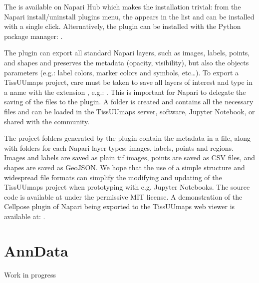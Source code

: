 \documentclass[letterpaper,10pt,english,openany,oneside]{sphinxmanual}
\begin{document}
\sphinxAtStartPar
The  is available on Napari Hub which makes the installation trivial: from the Napari install/uninstall plugins menu, the  appears in the list and can be installed with a single click. Alternatively, the plugin can be installed with the Python package manager: .

\sphinxAtStartPar
The plugin can export all standard Napari layers, such as images, labels, points, and shapes and preserves the metadata (opacity, visibility), but also the objects parameters (e.g.: label colors, marker colors and symbols, etc…). To export a TissUUmaps project, care must be taken to save all layers of interest and type in a name with the extension , e.g.: . This is important for Napari to delegate the saving of the files to the plugin. A folder is created and contains all the necessary files and can be loaded in the TissUUmaps server, software, Jupyter Notebook, or shared with the community.

\sphinxAtStartPar
The project folders generated by the plugin contain the metadata in a  file, along with folders for each Napari layer types: images, labels, points and regions. Images and labels are saved as plain tif images, points are saved as CSV files, and shapes are saved as GeoJSON. We hope that the use of a simple structure and widespread file formats can simplify the modifying and updating of the TissUUmaps project when prototyping with e.g. Jupyter Notebooks.
The source code is available at  under the permissive MIT license.
A demonstration of the Cellpose plugin of Napari being exported to the TissUUmaps web viewer is available at: .

\sphinxstepscope


\section{AnnData}
\label{\detokenize{docs/advanced/anndata:anndata}}\label{\detokenize{docs/advanced/anndata::doc}}
\sphinxAtStartPar
Work in progress



\renewcommand{\indexname}{Index}
\printindex
\end{document}
